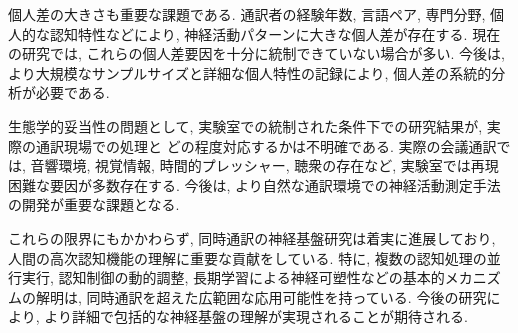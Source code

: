 個人差の大きさも重要な課題である.
通訳者の経験年数, 言語ペア, 専門分野, 個人的な認知特性などにより, 神経活動パターンに大きな個人差が存在する.
現在の研究では, これらの個人差要因を十分に統制できていない場合が多い.
今後は, より大規模なサンプルサイズと詳細な個人特性の記録により, 個人差の系統的分析が必要である.

生態学的妥当性の問題として, 実験室での統制された条件下での研究結果が, 実際の通訳現場での処理と どの程度対応するかは不明確である.
実際の会議通訳では, 音響環境, 視覚情報, 時間的プレッシャー, 聴衆の存在など, 実験室では再現困難な要因が多数存在する.
今後は, より自然な通訳環境での神経活動測定手法の開発が重要な課題となる.

これらの限界にもかかわらず, 同時通訳の神経基盤研究は着実に進展しており, 人間の高次認知機能の理解に重要な貢献をしている.
特に, 複数の認知処理の並行実行, 認知制御の動的調整, 長期学習による神経可塑性などの基本的メカニズムの解明は, 同時通訳を超えた広範囲な応用可能性を持っている.
今後の研究により, より詳細で包括的な神経基盤の理解が実現されることが期待される.